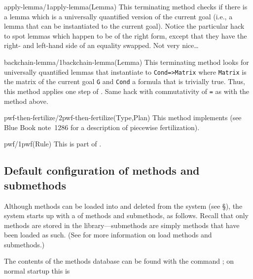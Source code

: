 \begin{method}{apply-lemma/1}{apply-lemma(Lemma)}%
{\tiny
}
This terminating method checks if there is a lemma which 
is a universally quantified version of the current goal (i.e., a lemma
that can be instantiated to the current goal).
\notnice
Notice the particular
hack to spot lemmas which happen to be of the right form, except that
they have the right- and left-hand side of an equality swapped. Not
very nice\ldots 
\end{method}

\begin{method}{backchain-lemma/1}{backchain-lemma(Lemma)}%
{\tiny
}
This terminating method looks for universally quantified lemmas that
instantiate to {\tt Cond=>Matrix} where {\tt Matrix} is the matrix of 
the current goal {\tt G} and {\tt Cond} a formula that is trivially true. 
Thus, this method applies one step of {\em {}}.
\notnice
Same hack with commutativity of {\tt =}
as with the  method above.
\end{method}

\begin{method}{pwf-then-fertilize/2}{pwf-then-fertilize(Type,Plan)}%
{\tiny
}
This method implements  (see Blue Book 
note~1286 for a description of piecewise fertilization).
\end{method}

\begin{method}{pwf/1}{pwf(Rule)}%
{\tiny
}
This is part of .
\end{method}


\subsection {Default configuration of methods and submethods}

Although methods can be loaded into and deleted from the system (see
\S{}), the system starts up with a  of methods and submethods, as follows.  Recall that
only methods are stored in the library---submethods are simply methods
that have been loaded as such.  (See  for more
information on load methods and submethods.)

The contents of the methods database can be found with the command
; on normal \clam startup this is

